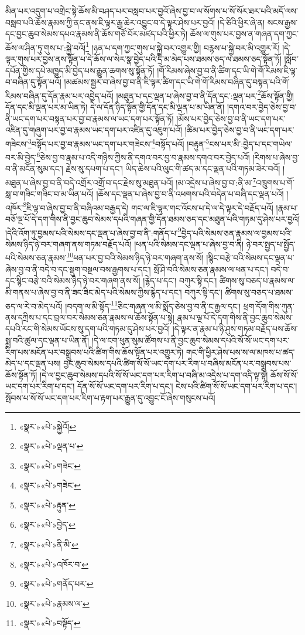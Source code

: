 མིན་པར་འདུག་པ་འགྲེང་སྟེ་ཆོས་མི་བཤད་པར་བསླབ་པར་བྱའོ་ཞེས་བྱ་བ་ལ་སོགས་པ་སོ་སོར་ཐར་པའི་མདོ་ལས་བསླབ་པའི་ཆོས་རྣམས་ཀྱི་ནང་ནས་ཇི་ལྟར་རྒྱ་ཆེར་འབྱུང་བ་དེ་ལྟར་ཤེས་པར་བྱའོ། །དེ་ཅིའི་ཕྱིར་ཞེ་ན། སངས་རྒྱས་དང་བྱང་ཆུབ་སེམས་དཔའ་རྣམས་ནི་ཆོས་གཙོ་བོར་མཛད་པའི་ཕྱིར་ཏེ། ཆོས་ལ་གུས་པར་བྱས་ན་གཞན་དག་ཀྱང་ཆོས་ལ་ཤིན་ཏུ་གུས་པ་:སྐྱེ་བའོ།\footnote{«སྣར་»«པེ་»སྐྱེའོ།} །ཉན་པ་དག་ཀྱང་གུས་པ་སྐྱེ་བར་འགྱུར་གྱི། བརྙས་པ་སྐྱེ་བར་མི་འགྱུར་རོ། །དེ་ལྟར་གུས་པར་བྱས་ནས་སྟོན་པ་དེ་ཆོས་ལ་སེར་སྣ་བྱེད་པའི་དྲི་མ་མེད་པས་ཐམས་ཅད་ལ་ཐམས་ཅད་སྟོན་ཏོ། །སློབ་དཔོན་གྱིས་དཔེ་མཁྱུད་མི་བྱེད་པས་རྒྱུན་ཆགས་སུ་སྟོན་ཏོ། །གོ་རིམས་ཞེས་བྱ་བ་ནི་ཚིག་དང་ཡི་གེ་གོ་རིམས་ཇི་ལྟ་བ་བཞིན་དུ་སྟོན་པའོ། །མཚམས་སྦྱར་བ་ཞེས་བྱ་བ་ནི་ཇི་ལྟར་ཚིག་དང་ཡི་གེ་གོ་རིམས་བཞིན་དུ་བསྟན་པའི་གོ་རིམས་བཞིན་དུ་དོན་རྣམ་པར་འབྱེད་པའོ། །མཐུན་པ་དང་ལྡན་པ་ཞེས་བྱ་བ་ནི་དོན་དང་:ལྡན་པར་\footnote{«སྣར་»«པེ་»ལྡན་པ་}ཆོས་སྟོན་གྱི། དོན་དང་མི་ལྡན་པར་མ་ཡིན་ཏེ། དེ་ལ་དོན་ཉིད་སྟོན་གྱི་དོན་དང་མི་ལྡན་པ་མ་ཡིན་ནོ། །དགའ་བར་བྱེད་ཅེས་བྱ་བ་ནི་ཡང་དག་པར་བསྟན་པར་བྱ་བ་རྣམས་ལ་ཡང་དག་པར་སྟོན་ཏོ། །མོས་པར་བྱེད་ཅེས་བྱ་བ་ནི་ཡང་དག་པར་འཛིན་དུ་གཞུག་པར་བྱ་བ་རྣམས་ཡང་དག་པར་འཛིན་དུ་འཇུག་པའོ། །ཚིམ་པར་བྱེད་ཅེས་བྱ་བ་ནི་ཡང་དག་པར་གཟེངས་\footnote{«སྣར་»«པེ་»གཟེང་}བསྟོད་པར་བྱ་བ་རྣམས་ཡང་དག་པར་གཟེངས་\footnote{«སྣར་»«པེ་»གཟེང་}བསྟོད་པའོ། །བརྟུན་\footnote{«སྣར་»«པེ་»རྟུན་}ངས་པར་མི་:བྱེད་པ་དང་གཡེལ་བར་མི་བྱེད་\footnote{«སྣར་»«པེ་»བྱེད་}ཅེས་བྱ་བ་རྣམ་པ་འདི་གཉིས་ཀྱིས་ནི་དགའ་བར་བྱ་བ་རྣམས་དགའ་བར་བྱེད་པའོ། །རིགས་པ་ཞེས་བྱ་བ་ནི་མངོན་སུམ་དང་། རྗེས་སུ་དཔག་པ་དང་། ཡིད་ཆེས་པའི་ལུང་གི་ཚད་མ་དང་ལྡན་པའི་གཏམ་ཟེར་བའོ། །མཐུན་པ་ཞེས་བྱ་བ་ནི་བདེ་འགྲོར་འགྲོ་བ་དང་རྗེས་སུ་མཐུན་པའོ། །མ་འདྲེས་པ་ཞེས་བྱ་བ་:ནི་མ་\footnote{«སྣར་»«པེ་»ནི་མི་}འཁྲུགས་པ་གོ་སླ་བ་གཟིང་གཟིང་བ་མ་ཡིན་པའོ། །ཆོས་དང་ལྡན་པ་ཞེས་བྱ་བ་ནི་འཕགས་པའི་བདེན་པ་བཞི་དང་ལྡན་པའོ། །འཁོར་\footnote{«སྣར་»«པེ་»འཁོར་བ་}ཇི་ལྟ་བ་ཞེས་བྱ་བ་ནི་བཞིའམ་བརྒྱད་དེ། གང་ལ་ཇི་ལྟར་གང་འོངས་པ་དེ་ལ་དེ་ལྟར་དེ་བརྗོད་པའོ། །རྣམ་པ་བཅོ་ལྔ་པོ་དེ་དག་གིས་ནི་བྱང་ཆུབ་སེམས་དཔའི་གཞན་གྱི་དོན་ཐམས་ཅད་དང་མཐུན་པའི་གཏམ་དུ་ཤེས་པར་བྱའོ། །དེའི་འོག་ཏུ་བྱམས་པའི་སེམས་དང་ལྡན་པ་ཞེས་བྱ་བ་ནི་:གནོད་པ་\footnote{«སྣར་»«པེ་»གནོད་པར་}བྱེད་པའི་སེམས་ཅན་རྣམས་ལ་བྱམས་པའི་སེམས་ཉིད་ཉེ་བར་གཞག་ནས་གཏམ་བརྗོད་པའོ། །ཕན་པའི་སེམས་དང་ལྡན་པ་ཞེས་བྱ་བ་ནི། ཉེ་བར་སྤྱད་པ་སྤྱོད་པའི་སེམས་ཅན་རྣམས་\footnote{«སྣར་»«པེ་»རྣམས་ལ་}ཕན་པར་བྱ་བའི་སེམས་ཉིད་ཉེ་བར་གཞག་ནས་སོ། །སྙིང་བརྩེ་བའི་སེམས་དང་ལྡན་པ་ཞེས་བྱ་བ་ནི་བདེ་བ་དང་སྡུག་བསྔལ་བས་རྒྱགས་པ་དང་། སྲོ་ཤི་བའི་སེམས་ཅན་རྣམས་ལ་ཕན་པ་དང་། བདེ་བ་དང་སྙིང་བརྩེ་བའི་སེམས་ཉིད་ཉེ་བར་གཞག་ནས་སོ། །རྙེད་པ་དང་། བཀུར་སྟི་དང་། ཚིགས་སུ་བཅད་པ་རྣམས་ལ་མི་གནས་པ་ཞེས་བྱ་བ་ནི་ཟང་ཟིང་མེད་པའི་སེམས་ཀྱིས་རྙེད་པ་དང་། བཀུར་སྟི་དང་། ཚིགས་སུ་བཅད་པ་ཐམས་ཅད་ལ་རེ་བ་མེད་པའོ། །བདག་ལ་མི་སྟོད་\footnote{«སྣར་»«པེ་»བསྟོད་}ཅིང་གཞན་ལ་མི་སྨོད་ཅེས་བྱ་བ་ནི་ང་རྒྱལ་དང་། ཕྲག་དོག་གིས་ཀུན་ནས་དཀྲིས་པ་དང་བྲལ་བར་སེམས་ཅན་རྣམས་ལ་ཆོས་སྟོན་པ་སྟེ། རྣམ་པ་ལྔ་པོ་དེ་དག་གིས་ནི་བྱང་ཆུབ་སེམས་དཔའི་རང་གི་སེམས་ཡོངས་སུ་དག་པའི་གཏམ་དུ་ཤེས་པར་བྱའོ། །དེ་ལྟར་ན་རྣམ་པ་ཉི་ཤུས་གཏམ་བརྗོད་པས་ཆོས་སྨྲ་བའི་ཚུལ་དང་ལྡན་པ་ཡིན་ནོ། །དེ་ལ་ངག་ཕུན་སུམ་ཚོགས་པ་ནི་བྱང་ཆུབ་སེམས་དཔའི་སོ་སོ་ཡང་དག་པར་རིག་པས་མངོན་པར་བསྒྲུབས་པའི་ཚིག་གིས་ཆོས་སྟོན་པར་འགྱུར་ཏེ། གང་གི་ཕྱིར་ཤེས་པས་ས་ལ་མཁས་པ་ཚད་མེད་པ་དང་ལྡན་པས། བྱང་ཆུབ་སེམས་དཔའི་ཚིག་སོ་སོ་ཡང་དག་པར་རིག་པ་བཞིས་མངོན་པར་བསྒྲུབས་པས་ཆོས་སྟོན་ཏོ། །དེ་ལ་བྱང་ཆུབ་སེམས་དཔའི་སོ་སོ་ཡང་དག་པར་རིག་པ་བཞི་མ་འདྲེས་པ་དག་འདི་ལྟ་སྟེ། ཆོས་སོ་སོ་ཡང་དག་པར་རིག་པ་དང་། དོན་སོ་སོ་ཡང་དག་པར་རིག་པ་དང་། ངེས་པའི་ཚིག་སོ་སོ་ཡང་དག་པར་རིག་པ་དང་། སྤོབས་པ་སོ་སོ་ཡང་དག་པར་རིག་པ་རྟག་པར་རྒྱུན་དུ་འབྱུང་ངོ་ཞེས་གསུངས་པའོ། 
